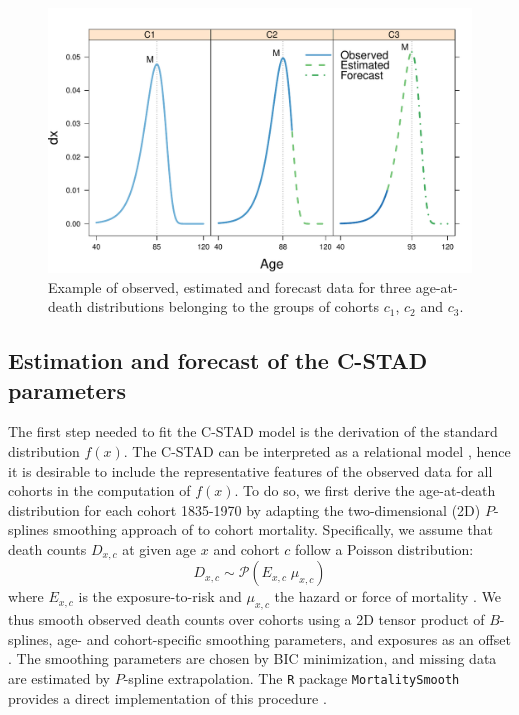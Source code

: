 \documentclass[11pt, a4paper]{article}
\begin{document}
\begin{figure}[h!]
	\begin{center}
		\includegraphics[scale=0.7]{./Figures/F3.pdf} 
		\caption{Example of observed, estimated and forecast data for three age-at-death distributions belonging to the groups of cohorts $c_1$, $c_2$ and $c_3$.\label{Fig:DxExample}}    
	\end{center}
\end{figure}

\subsection{Estimation and forecast of the C-STAD parameters}
\label{Subsec:EstimForeC-STAD}
The first step needed to fit the C-STAD model is the derivation of the standard distribution $f(x)$. The C-STAD can be interpreted as a relational model \citep{brass1971scale}, hence it is desirable to include the representative features of the observed data for all cohorts in the computation of $f(x)$. To do so, we first derive the age-at-death distribution for each cohort 1835-1970 by adapting the two-dimensional (2D) $P$-splines smoothing approach of \cite{currie2004smoothing} to cohort mortality. Specifically, we assume that death counts $D_{x,c}$ at given age $x$ and cohort $c$ follow a Poisson distribution:
\begin{equation}\label{Eq:Poisson}
D_{x,c} \sim \mathcal{P}(E_{x,c} \; \mu_{x,c}) 
\end{equation}
where $E_{x,c}$ is the exposure-to-risk and $\mu_{x,c}$ the hazard or force of mortality \citep{brillinger1986biometrics}. We thus smooth observed death counts over cohorts using a 2D tensor product of  $B$-splines, age- and cohort-specific smoothing parameters, and exposures as an offset \citep{eilers1996flexible}. The smoothing parameters are chosen by BIC minimization, and missing data are estimated by $P$-spline extrapolation. The \texttt{R} package \texttt{MortalitySmooth} provides a direct implementation of this procedure \citep{camarda2012mortalitysmooth}. \par 
\end{document}
